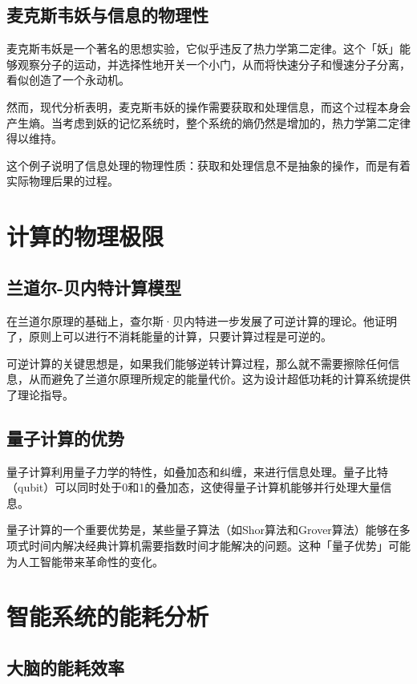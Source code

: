 \subsection{麦克斯韦妖与信息的物理性}

麦克斯韦妖是一个著名的思想实验，它似乎违反了热力学第二定律。这个「妖」能够观察分子的运动，并选择性地开关一个小门，从而将快速分子和慢速分子分离，看似创造了一个永动机。

然而，现代分析表明，麦克斯韦妖的操作需要获取和处理信息，而这个过程本身会产生熵。当考虑到妖的记忆系统时，整个系统的熵仍然是增加的，热力学第二定律得以维持。

这个例子说明了信息处理的物理性质：获取和处理信息不是抽象的操作，而是有着实际物理后果的过程。

\section{计算的物理极限}

\subsection{兰道尔-贝内特计算模型}

在兰道尔原理的基础上，查尔斯·贝内特进一步发展了可逆计算的理论。他证明了，原则上可以进行不消耗能量的计算，只要计算过程是可逆的。

可逆计算的关键思想是，如果我们能够逆转计算过程，那么就不需要擦除任何信息，从而避免了兰道尔原理所规定的能量代价。这为设计超低功耗的计算系统提供了理论指导。

\subsection{量子计算的优势}

量子计算利用量子力学的特性，如叠加态和纠缠，来进行信息处理。量子比特（qubit）可以同时处于0和1的叠加态，这使得量子计算机能够并行处理大量信息。

量子计算的一个重要优势是，某些量子算法（如Shor算法和Grover算法）能够在多项式时间内解决经典计算机需要指数时间才能解决的问题。这种「量子优势」可能为人工智能带来革命性的变化。

\section{智能系统的能耗分析}

\subsection{大脑的能耗效率}

